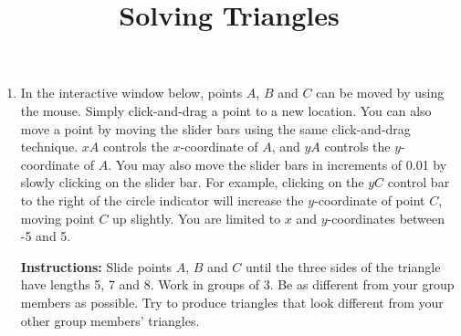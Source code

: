 \documentclass[number]{ximera}
\title{Solving Triangles}
\begin{document}
\begin{abstract}
\end{abstract}
\maketitle

\begin{enumerate}

\item In the interactive window below, points $A$, $B$ and $C$ can be moved by using the mouse. Simply click-and-drag a point to a new location. You can also move a point by moving the slider bars using the same click-and-drag technique. $xA$ controls the $x$-coordinate of $A$, and $yA$ controls the $y$-coordinate of $A$. You may also move the slider bars in increments of 0.01 by slowly clicking on the slider bar. For example, clicking on the $yC$ control bar to the right of the circle indicator will increase the $y$-coordinate of point $C$, moving point $C$ up slightly. You are limited to $x$ and $y$-coordinates between -5 and 5. 

{\bf {Instructions:}} Slide points $A$, $B$ and $C$ until the three sides of the triangle have lengths 5, 7 and 8. Work in groups of 3. Be as different from your group members as possible. Try to produce triangles that look different from your other group members' triangles.



%
%
%


\end{enumerate}
\end{document}
